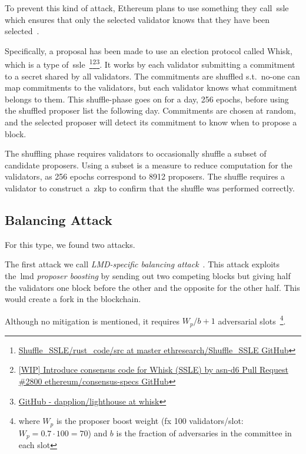 To prevent this kind of attack,
Ethereum plans
to use something they call~\gls{ssle} which ensures
that only the selected validator knows that they have been selected~\cite{EthereumSSLE2024,EthereumResearchSSLE2024}.

Specifically, a proposal has been made to use an election protocol called Whisk, which is a type of~\gls{ssle}~\cite{Whisk2024}\footnote{\href{https://github.com/ethresearch/Shuffle_SSLE/tree/master/rust_code/src}{Shuffle\_SSLE/rust\_code/src at master ethresearch/Shuffle\_SSLE GitHub}}\footnote{\href{https://github.com/ethereum/consensus-specs/pull/2800}{[WIP] Introduce consensus code for Whisk (SSLE) by asn-d6 Pull Request \#2800 ethereum/consensus-specs GitHub}}\footnote{\href{https://github.com/dapplion/lighthouse/tree/whisk}{GitHub - dapplion/lighthouse at whisk}}.
It works by each validator submitting a commitment to a secret shared by all validators.
The commitments are shuffled s.t.\ no-one can map commitments to the validators,
but each validator knows what commitment belongs to them.
This shuffle-phase goes on for a day, 256 epochs, before using the shuffled proposer list the following day.
Commitments are chosen at random, and the selected proposer will detect its commitment to know when to propose a block.

The shuffling phase requires validators to occasionally shuffle a subset of candidate proposers.
Using a subset is a measure to reduce computation for the validators, as 256 epochs correspond to 8912 proposers.
The shuffle requires a validator to construct a~\gls{zkp} to confirm that the shuffle was performed correctly.

\subsection{Balancing Attack}\label{subsec:balancing-attack}
For this type, we found two attacks.

The first attack we call \textit{LMD-specific balancing attack}~\cite{10.1145/3560829.3563560}.
This attack exploits the~\gls{lmd} \textit{proposer
boosting} by sending out two competing blocks
but giving half the validators one block before the other and the opposite for the other half.
This would create a fork in the blockchain.

Although no mitigation is mentioned,
it requires $W_p/b+1$ adversarial slots~\footnote{where $W_p$ is the proposer boost weight (fx 100 validators/slot: $W_p=0.7\cdot100=70$)
    and $b$ is the fraction of adversaries in the committee in each slot}.


